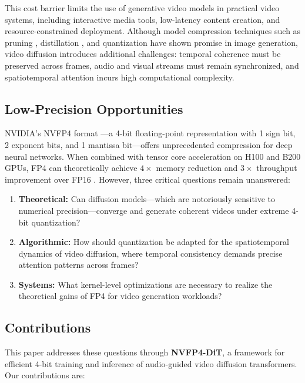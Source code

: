 \documentclass[journal,twoside]{IEEEtran}
\theoremstyle{definition}
\theoremstyle{remark}
\begin{document}
This cost barrier limits the use of generative video models in practical video systems, including interactive media tools, low-latency content creation, and resource-constrained deployment. Although model compression techniques such as pruning \cite{han2016deep}, distillation \cite{hinton2014distilling}, and quantization \cite{jacob2018quantization} have shown promise in image generation, video diffusion introduces additional challenges: temporal coherence must be preserved across frames, audio and visual streams must remain synchronized, and spatiotemporal attention incurs high computational complexity.

\subsection{Low-Precision Opportunities}
NVIDIA's NVFP4 format \cite{nvidia2024nvfp4}---a 4-bit floating-point representation with 1 sign bit, 2 exponent bits, and 1 mantissa bit---offers unprecedented compression for deep neural networks. When combined with tensor core acceleration on H100 and B200 GPUs, FP4 can theoretically achieve $4\times$ memory reduction and $3\times$ throughput improvement over FP16 \cite{nvidia2022h100}. However, three critical questions remain unanswered:

\begin{enumerate}
    \item \textbf{Theoretical:} Can diffusion models---which are notoriously sensitive to numerical precision---converge and generate coherent videos under extreme 4-bit quantization?
    \item \textbf{Algorithmic:} How should quantization be adapted for the spatiotemporal dynamics of video diffusion, where temporal consistency demands precise attention patterns across frames?
    \item \textbf{Systems:} What kernel-level optimizations are necessary to realize the theoretical gains of FP4 for video generation workloads?
\end{enumerate}

\subsection{Contributions}
This paper addresses these questions through \textbf{NVFP4-DiT}, a framework for efficient 4-bit training and inference of audio-guided video diffusion transformers. Our contributions are:
\end{document}
